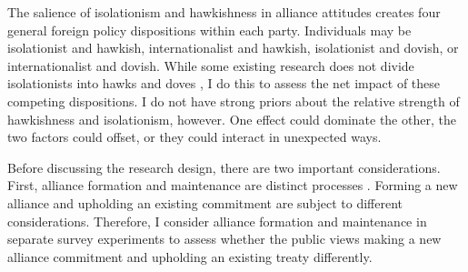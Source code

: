 \documentclass[12pt]{article}
\begin{document}
The salience of isolationism and hawkishness in alliance attitudes creates four general foreign policy dispositions within each party. 
Individuals may be isolationist and hawkish, internationalist and hawkish, isolationist and dovish, or internationalist and dovish.
While some existing research does not divide isolationists into hawks and doves \citep{Kertzeretal2014}, I do this to assess the net impact of these competing dispositions.   
I do not have strong priors about the relative strength of hawkishness and isolationism, however.
One effect could dominate the other, the two factors could offset, or they could interact in unexpected ways.


Before discussing the research design, there are two important considerations. 
First, alliance formation and maintenance are distinct processes \citep{Snyder1997}. 
Forming a new alliance and upholding an existing commitment are subject to different considerations.
Therefore, I consider alliance formation and maintenance in separate survey experiments to assess whether the public views making a new alliance commitment and upholding an existing treaty differently. 


\end{document}
